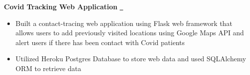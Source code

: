 \textbf{Covid Tracking Web Application} \href{https://github.com/levinaind/TO-Hacks-2021}{\github\ } \par
\begin{itemize}
	\item Built a contact-tracing web application using Flask web framework that allows users to add previously visited locations using Google Maps API and alert users if there has been contact with Covid patients
	\item Utilized Heroku Postgres Database to store web data and used SQLAlchemy ORM to retrieve data
\end{itemize}
\vspace{0.1cm} \par

